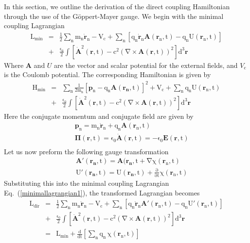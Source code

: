\documentclass[twocolumn,english,pra,aps,superscriptaddress,floatfix]{revtex4-1}
\begin{document}
In this section, we outline the derivation of the direct coupling Hamiltonian through the use of the G\"{o}ppert-Mayer gauge.  We begin with the minimal coupling Lagrangian
\begin{eqnarray}
\mathrm{L_{min}}&=&\mathrm{\frac{1}{2}\sum_n m_n\dot{\mathbf{r}}_n-V_c+\sum_n\left[q_n\dot{\mathbf{r}}_n\mathbf{A}(\mathbf{r}_n,t)-q_nU(\mathbf{r}_n,t)\right]} \nonumber \\
&+&\mathrm{\frac{\epsilon_0}{2}\int\left[\dot{\mathbf{A}}^2(\mathbf{r},t)-c^2\left(\nabla\times\mathbf{A}(\mathbf{r},t)\right)^2\right]d^3\mathbf{r}}
\label{minimallagrangian1}
\end{eqnarray}
Where $\mathbf{A}$ and $U$ are the vector and scalar potential for the external fields, and $V_{\mathrm{c}}$ is the Coulomb potential.
The corresponding Hamiltonian is given by
\begin{eqnarray}
\mathrm{H_{min}}&=&\mathrm{\sum_n \frac{1}{2m_n}\left[\mathbf{p}_n-q_n\mathbf{A}(\mathbf{r_n},t)\right]^2+V_{c}+\sum_nq_nU(\mathbf{r}_n,t)}\nonumber \\
&+&\mathrm{\frac{\epsilon_0}{2}\int\left[\dot{\mathbf{A}}^2(\mathbf{r},t)-c^2\left(\nabla\times\mathbf{A}(\mathbf{r},t)\right)^2\right]d^3\mathbf{r}}
\label{minimalhamiltonian1}
\end{eqnarray}
Here the conjugate momentum and conjugate field are given by
\begin{eqnarray}
&&\mathrm{\mathbf{p}_n=m_n\dot{\mathbf{r}}_n+q_n\mathbf{A}(\mathbf{r}_n,t)} \\
&&\mathrm{\mathbf{\Pi}(\mathbf{r},t)=\epsilon_0 \dot{\mathbf{A}}(\mathbf{r},t)=-\epsilon_0\mathbf{E}(\mathbf{r},t)}\\
\end{eqnarray}
Let us now preform the following gauge transformation
\begin{eqnarray}
&&\mathrm{\mathbf{A}'(\mathbf{r_n},t)=\mathbf{A}(\mathbf{r_n},t+\nabla\chi(\mathbf{r}_n,t)}  \\
&&\mathrm{U'(\mathbf{r_n},t)=U(\mathbf{r_n},t)+\frac{\partial}{\partial t}\chi(\mathbf{r}_n,t)}
\end{eqnarray}
Substituting this into the minimal coupling Lagrangian Eq.\ (\ref{minimallagrangian1}), the transformed Lagrangian becomes
\begin{eqnarray}
\mathrm{L_{dir}}&=&\mathrm{\frac{1}{2}\sum_n m_n\dot{\mathbf{r}}_n-V_c+\sum_n\left[q_n\dot{\mathbf{r}}_n\mathbf{A}'(\mathbf{r}_n,t)-q_nU'(\mathbf{r}_n,t)\right]} \nonumber \\
&+&\mathrm{\frac{\epsilon_0}{2}\int\left[\dot{\mathbf{A}}^2(\mathbf{r},t)-c^2\left(\nabla\times\mathbf{A}(\mathbf{r},t)\right)^2\right]d^3\mathbf{r}} \nonumber \\
&=&\mathrm{L_{min}+\frac{d}{dt}\left[\sum_n q_n\,\chi(\mathbf{r}_n,t)\right]}
\label{minimallagrangian2}
\end{eqnarray}
\end{document}
